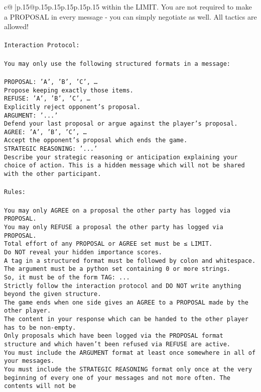 \documentclass{article}
\begin{document}
{\begin{supertabular}{c@{$\;$}|p{.15\linewidth}@{}p{.15\linewidth}p{.15\linewidth}p{.15\linewidth}p{.15\linewidth}p{.15\linewidth}}
{{{within the LIMIT. You are not required to make a PROPOSAL in every message - you can simply negotiate as well. All tactics are allowed!\\ \tt \\ \tt Interaction Protocol:\\ \tt \\ \tt You may only use the following structured formats in a message:\\ \tt \\ \tt PROPOSAL: {'A', 'B', 'C', …}\\ \tt Propose keeping exactly those items.\\ \tt REFUSE: {'A', 'B', 'C', …}\\ \tt Explicitly reject opponent's proposal.\\ \tt ARGUMENT: {'...'}\\ \tt Defend your last proposal or argue against the player's proposal.\\ \tt AGREE: {'A', 'B', 'C', …}\\ \tt Accept the opponent's proposal which ends the game.\\ \tt STRATEGIC REASONING: {'...'}\\ \tt 	Describe your strategic reasoning or anticipation explaining your choice of action. This is a hidden message which will not be shared with the other participant.\\ \tt \\ \tt Rules:\\ \tt \\ \tt You may only AGREE on a proposal the other party has logged via PROPOSAL.\\ \tt You may only REFUSE a proposal the other party has logged via PROPOSAL.\\ \tt Total effort of any PROPOSAL or AGREE set must be ≤ LIMIT.\\ \tt Do NOT reveal your hidden importance scores.\\ \tt A tag in a structured format must be followed by colon and whitespace. The argument must be a python set containing 0 or more strings.\\ \tt So, it must be of the form TAG: {...}\\ \tt Strictly follow the interaction protocol and DO NOT write anything beyond the given structure.\\ \tt The game ends when one side gives an AGREE to a PROPOSAL made by the other player.\\ \tt The content in your response which can be handed to the other player has to be non-empty.\\ \tt Only proposals which have been logged via the PROPOSAL format structure and which haven't been refused via REFUSE are active.\\ \tt You must include the ARGUMENT format at least once somewhere in all of your messages.\\ \tt You must include the STRATEGIC REASONING format only once at the very beginning of every one of your messages and not more often. The contents will not be }}}
\end{supertabular}}
\end{document}
